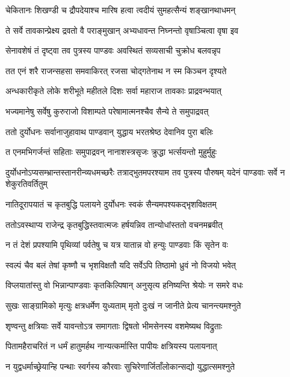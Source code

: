 \twolineshloka
{चेकितानः शिखण्डी च द्रौपदेयाश्च मारिष}
{हत्वा त्वदीयं सुमहत्सैन्यं शङ्खानथाधमन्}


\twolineshloka
{ते सर्वे तावकान्प्रेक्ष्य द्रवतो वै पराङ्मुखान्}
{अभ्यधावन्त निघ्नन्तो वृषाञ्चित्वा वृषा इव}


\twolineshloka
{सेनावशेषं तं दृष्ट्वा तव पुत्रस्य पाण्डवः}
{अवस्थितं सव्यसाची चुक्रोध बलवन्नृप}


\twolineshloka
{तत एनं शरै राजन्सहसा समवाकिरत्}
{रजसा चोद्गतेनाथ न स्म किञ्चन दृश्यते}


\twolineshloka
{अन्धकारीकृते लोके शरीभूते महीतले}
{दिशः सर्वा महाराज तावकाः प्राद्रवन्भयात्}


\twolineshloka
{भज्यमानेषु सर्वेषु कुरुराजो विशाम्पते}
{परेषामात्मनश्चैव सैन्ये ते समुपाद्रवत्}


\twolineshloka
{ततो दुर्योधनः सर्वानाजुहावाथ पाण्डवान्}
{युद्धाय भरतश्रेष्ठ देवानिव पुरा बलिः}


\twolineshloka
{त एनमभिगर्जन्तं सहिताः समुपाद्रवन्}
{नानाशस्त्रसृजः क्रुद्धा भर्त्सयन्तो मुहुर्मुहुः}


दुर्योधनोऽप्यसम्भ्रान्तस्तानरीन्व्यधमच्छरैः
\twolineshloka
{तत्राद्भुतमपरश्याम तव पुत्रस्य पौरुषम्}
{यदेनं पाण्डवाः सर्वे न शेकुरतिवर्तितुम्}


\twolineshloka
{नातिदूरापयातं च कृतबुद्धि पलायने}
{दुर्योधनः स्वकं सैन्यमपश्यकद्भृशविक्षतम्}


\twolineshloka
{ततोऽवस्थाप्य राजेन्द्र कृतबुद्धिस्तवात्मजः}
{हर्षयन्निव तान्योधांस्ततो वचनमब्रवीत्}


\twolineshloka
{न तं देशं प्रपश्यामि पृथिव्यां पर्वतेषु च}
{यत्र यातान्न वो हन्युः पाण्डवाः किं सृतेन वः}


\twolineshloka
{स्वल्पं चैव बलं तेषां कृष्णौ च भृशविक्षतौ}
{यदि सर्वेऽपि तिष्ठामो ध्रुवं नो विजयो भवेत्}


\twolineshloka
{विप्लयातांस्तु वो भिन्नान्पाण्डवाः कृतकिल्पिषान्}
{अनुसृत्य हनिष्यन्ति श्रेयोः न समरे वधः}


\twolineshloka
{सुखः साङ्ग्रामिको मृत्युः क्षत्रधर्मेण युध्यताम्}
{मृतो दुःखं न जानीते प्रेत्य चानन्त्यमश्नुते}


\twolineshloka
{शृण्वन्तु क्षत्रियाः सर्वे यावन्तोऽत्र समागताः}
{द्विषतो भीमसेनस्य वशमेष्यथ विद्रुताः}


\twolineshloka
{पितामहैराचरितं न धर्मं हातुमर्हथ}
{नान्यत्कर्मास्ति पापीयः क्षत्रियस्य पलायनात्}


\twolineshloka
{न युद्वधर्माच्छ्रेयान्हि पन्थाः स्वर्गस्य कौरवाः}
{सुचिरेणार्जिताँलोकान्सद्यो युद्धात्समश्नुते}


